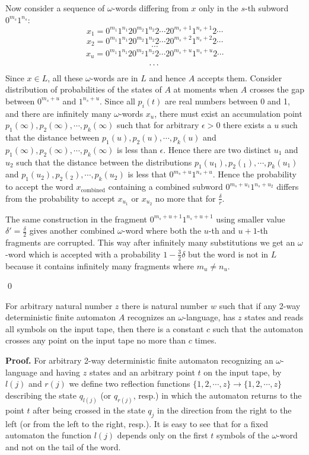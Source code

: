\documentclass{llncs}
\begin{document}
Now consider a sequence of $\omega$-words differing from $x$ only in the $s$-th subword $0^{m_s}1^{n_s}$:
$$
x_1 = 0^{m_1}1^{n_1}20^{m_2}1^{n_2}2\cdots 20^{m_s+1}1^{n_s+1}2\cdots 
$$
$$
x_2 = 0^{m_1}1^{n_1}20^{m_2}1^{n_2}2\cdots 20^{m_s+2}1^{n_s+2}2\cdots 
$$
$$
\cdots 
$$
$$
x_u = 0^{m_1}1^{n_1}20^{m_2}1^{n_2}2\cdots 20^{m_s+u}1^{n_s+u}2\cdots 
$$
$$
\cdots \\
$$
Since $x \in L$, all these $\omega $-words are in $L$ and hence $A$ accepts them. Consider distribution of probabilities of the states
of $A$ at moments when $A$ crosses the gap between $0^{m_s+u}$ and $1^{n_s+u}$. Since all $p_i(t)$ are real numbers between 0 and 1, and there are infinitely many $\omega $-words $x_u$, there must exist an accumulation point $p_1(\infty ), p_2(\infty ), \cdots , p_k(\infty )$ such that for arbitrary
$\epsilon > 0$ there exists a $u$ such that the distance between $p_1(u), p_2(u), \cdots , p_k(u)$ and $p_1(\infty ), p_2(\infty ), \cdots , p_k(\infty )$ is less than $\epsilon $. Hence there are two distinct  $u_1$ and $u_2$ such that the distance between the distributions $p_1(u_1), p_2(_1), \cdots , p_k(u_1)$
and $p_1(u_2), p_2(_2), \cdots , p_k(u_2)$ is less that $0^{m_s+u}1^{n_s+u}$. Hence the probability to accept the word $x_{\mbox{combined}}$ containing a combined subword $0^{m_s+u_1}1^{n_s+u_2}$ differs from the probability to accept $x_{u_1}$ or $x_{u_2}$ no more that for $\frac{\delta }{r}$.

The same construction in the fragment $0^{m_s+u+1}1^{n_s+u+1}$ using smaller value  $\delta ' = \frac{\delta }{2}$ gives another combined $\omega $-word where both the $u$-th and $u+1$-th fragments are corrupted. This way after infinitely many substitutions we get an $\omega $-word which is accepted with a probability 
$1- \frac{3}{2}\delta $ but the word is not in $L$ because it contains infinitely many fragments where $m_u \neq n_u$.

\qed



\begin{lemma} 
\label{L1}
For arbitrary natural number $z$ there is natural number $w$ such that
if any 2-way deterministic finite automaton $A$ recognizes an $\omega $-language, has $z$ states and reads all symbols on the input tape, then there is a constant $c$ such that the automaton  crosses any point on the input tape
no more than $c$ times.
\end{lemma}

{\bf Proof.}  For arbitrary  2-way deterministic finite automaton recognizing an $\omega $-language and having $z$ states and an arbitrary point $t$ on the input tape, by $l(j)$ and $r(j)$  we define two reflection functions $\{1,2,\cdots ,z\} \to \{1,2,\cdots ,z\}$ describing the state $q_{l(j)}$ (or $q_{r(j)}$, resp.) in which the automaton returns to the point $t$ after being crossed in the state $q_j$ in the direction from the right to the left (or from the left to the right, resp.). It is easy to see that for a fixed automaton the function $l(j)$ depends only on the first $t$ symbols of the $\omega $-word and not on the tail of the word.
\end{document}
